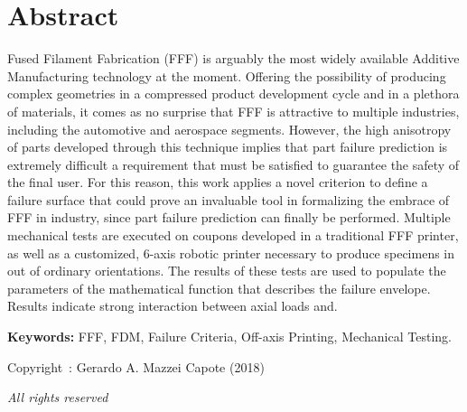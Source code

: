 \documentclass[main.tex]{subfiles}
\begin{document}
\setcounter{page}{1}
\chapter*{Abstract}
Fused Filament Fabrication (FFF) is arguably the most widely available Additive Manufacturing technology at the moment. Offering the possibility of producing complex geometries in a compressed product development cycle and in a plethora of materials, it comes as no surprise that FFF is attractive to multiple industries, including the automotive and aerospace segments. However, the high anisotropy of parts developed through this technique implies that part failure prediction is extremely difficult \textemdash a requirement that must be satisfied to guarantee the safety of the final user. For this reason, this work applies a novel criterion to define a failure surface that could prove an invaluable tool in formalizing the embrace of FFF in industry, since part failure prediction can finally be performed. Multiple mechanical tests are executed on coupons developed in a traditional FFF printer, as well as a customized, 6-axis robotic printer necessary to produce specimens in out of ordinary orientations. The results of these tests are used to populate the parameters of the mathematical function that describes the failure envelope. Results indicate strong interaction between axial loads and. %
 
\vspace{10mm} %
\textbf{Keywords:} FFF, FDM, Failure Criteria, Off-axis Printing, Mechanical Testing.

\vfill %
\begin{center}
Copyright~\textcopyright: Gerardo A. Mazzei Capote (2018)

\emph{All rights reserved}	
\end{center}
\end{document}
